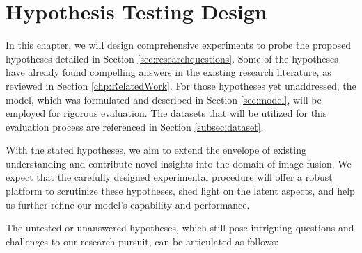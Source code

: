 \chapter{Hypothesis Testing Design}

In this chapter, we will design comprehensive experiments to probe the proposed hypotheses detailed in Section \ref{sec:researchquestions}. Some of the hypotheses have already found compelling answers in the existing research literature, as reviewed in Section \ref{chp:RelatedWork}. For those hypotheses yet unaddressed, the model, which was formulated and described in Section \ref{sec:model}, will be employed for rigorous evaluation. The datasets that will be utilized for this evaluation process are referenced in Section \ref{subsec:dataset}. 

With the stated hypotheses, we aim to extend the envelope of existing understanding and contribute novel insights into the domain of image fusion. We expect that the carefully designed experimental procedure will offer a robust platform to scrutinize these hypotheses, shed light on the latent aspects, and help us further refine our model's capability and performance.

The untested or unanswered hypotheses, which still pose intriguing questions and challenges to our research pursuit, can be articulated as follows:

